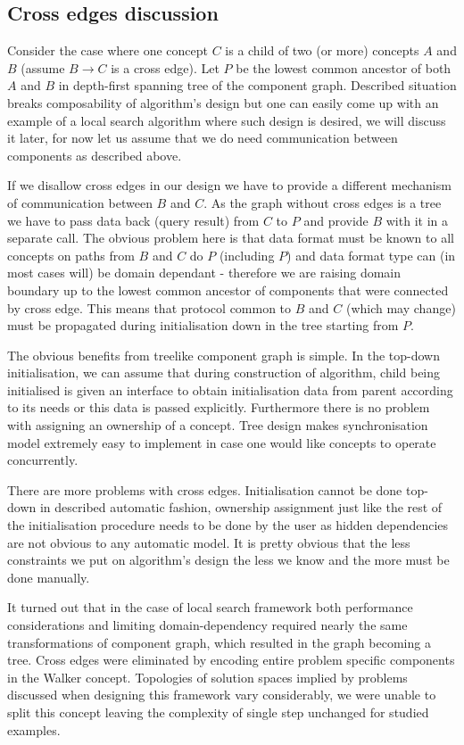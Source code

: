 \subsection{Cross edges discussion}
Consider the case where one concept $C$ is a child of two (or more) concepts
$A$ and $B$ (assume $B \to C$ is a cross edge). Let $P$ be the lowest common
ancestor of both $A$ and $B$ in depth-first spanning tree of the component
graph. Described situation breaks composability of algorithm's design but one
can easily come up with an example of a local search algorithm where such
design is desired, we will discuss it later, for now let us assume that we do
need communication between components as described above.

If we disallow cross edges in our design we have to provide a different mechanism
of communication between $B$ and $C$. As the graph without cross edges is a
tree we have to pass data back (query result) from $C$ to $P$ and provide $B$
with it in a separate call. The obvious problem here is that data format must be
known to all concepts on paths from $B$ and $C$ do $P$ (including $P$) and data
format type can (in most cases will) be domain dependant - therefore we are
raising domain boundary up to the lowest common ancestor of components that were
connected by cross edge. This means that protocol common to $B$ and $C$ (which
may change) must be propagated during initialisation down in the tree starting
from $P$.

The obvious benefits from treelike component graph is simple. In the top-down
initialisation, we can assume that during construction of algorithm, child being
initialised is given an interface to obtain initialisation data from parent
according to its needs or this data is passed explicitly. Furthermore there is
no problem with assigning an ownership of a concept. Tree design makes
synchronisation model extremely easy to implement in case one would like
concepts to operate concurrently.

There are more problems with cross edges. Initialisation cannot be done
top-down in described automatic fashion, ownership assignment just like the
rest of the initialisation procedure needs to be done by the user as hidden
dependencies are not obvious to any automatic model. It is pretty obvious that
the less constraints we put on algorithm's design the less we know and the more
must be done manually.

It turned out that in the case of local search framework both performance
considerations and limiting domain-dependency required nearly the same
transformations of component graph, which resulted in the graph becoming a
tree. Cross edges were eliminated by encoding entire problem specific
components in the Walker concept. Topologies of solution spaces implied by
problems discussed when designing this framework vary considerably, we were
unable to split this concept leaving the complexity of single step unchanged for
studied examples.


